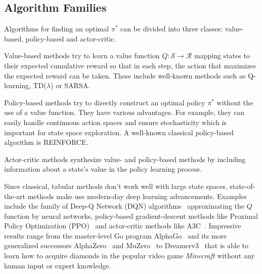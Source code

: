 \subsection{Algorithm Families}\label{sec:rl-algorithms}

Algorithms for finding an optimal $\pi^*$ can be divided into three classes:
value-based, policy-based and actor-critic.

Value-based methods try to learn a value function $Q:\mathcal{S}\rightarrow \mathcal{R}$
mapping states to their expected cumulative reward so that in each step, the
action that maximizes the expected reward can be taken.
These include well-known methods such as Q-learning, TD($\lambda$) or SARSA.

Policy-based methods try to directly construct an optimal policy $\pi^*$ without the
use of a value function.
They have various advantages.
For example, they can easily handle continuous action spaces and ensure stochasticity
which is important for state space exploration.
A well-known classical policy-based algorithm is
REINFORCE.

Actor-critic methods synthesize value- and policy-based methods by including information
about a state's value in the policy learning process.

Since classical, tabular methods don't work well with large state spaces,
state-of-the-art methods make use modern-day deep learning advancements.
Examples include the family of Deep-Q Network (DQN)
algorithms~\cite{mnih_human-level_2015,hessel_rainbow_2017} approximating the $Q$
function by neural networks, policy-based gradient-descent methods like
Proximal Policy Optimization (PPO)~\cite{schulman_proximal_2017} and actor-critic
methods like A3C~\cite{mnih_asynchronous_2016}.
Impressive results range from the master-level Go program
AlphaGo~\cite{silver_mastering_2016} and its more generalized successors
AlphaZero~\cite{silver_mastering_2017} and MuZero~\cite{schrittwieser_mastering_2020}
to Dreamerv3~\cite{hafner_mastering_2024} that is able to learn how to acquire
diamonds in the popular video game \textit{Minecraft} without any human input
or expert knowledge.

